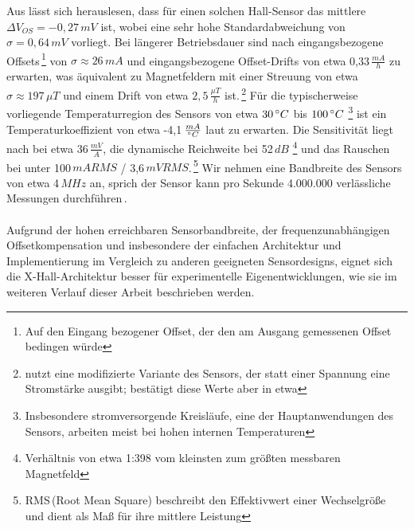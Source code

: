 \documentclass[12pt, a4paper]{article}
\begin{document}
Aus \cite{cres18} lässt sich herauslesen, dass für einen solchen Hall-Sensor das mittlere $\Delta{V_{OS}}=-0,27\,mV$ ist, wobei eine sehr hohe Standardabweichung von $\sigma=0,64\,mV$ vorliegt.\newline
Bei längerer Betriebsdauer sind nach \cite{cres23} eingangsbezogene Offsets\,\footnote{Auf den Eingang bezogener Offset, der den am Ausgang gemessenen Offset bedingen würde} von $\sigma\approx26\,mA$ und eingangsbezogene Offset-Drifts von etwa 0,33\,$\frac{mA}{h}$ zu erwarten, was äquivalent zu Magnetfeldern mit einer Streuung von etwa $\sigma\approx197\,\mu{T}$ und einem Drift von etwa $2,5\,\frac{\mu{T}}{h}$ ist.\,\footnote{\cite{cres23} nutzt eine modifizierte Variante des Sensors, der statt einer Spannung eine Stromstärke ausgibt; \cite{cres21} bestätigt diese Werte aber in etwa}\newline
Für die typischerweise vorliegende Temperaturregion des Sensors von etwa $30\,\degree{C}$ bis $100\,\degree{C}$ \footnote{Insbesondere stromversorgende Kreisläufe, eine der Hauptanwendungen des Sensors, arbeiten meist bei hohen internen Temperaturen} ist ein Temperaturkoeffizient von etwa -4,1\,$\frac{mA}{\degree{C}}$ laut \cite{cres23} zu erwarten.\newline
Die Sensitivität liegt nach \cite{cres21Hall} bei etwa 36\,$\frac{mV}{A}$, die dynamische Reichweite bei 52\,$dB$ \footnote{Verhältnis von etwa 1:398 vom kleinsten zum größten messbaren Magnetfeld} und das Rauschen bei unter 100\,$mA RMS$ / 3,6\,$mV RMS$.\,\footnote{RMS\,(Root Mean Square) beschreibt den Effektivwert einer Wechselgröße und dient als Maß für ihre mittlere Leistung}\newline
Wir nehmen eine Bandbreite des Sensors von etwa 4\,$MHz$ an, sprich der Sensor kann pro Sekunde 4.000.000 verlässliche Messungen durchführen\,\cite{cres21}. \paragraph{}

Aufgrund der hohen erreichbaren Sensorbandbreite, der frequenzunabhängigen Offsetkompensation und insbesondere der einfachen Architektur und Implementierung im Vergleich zu anderen geeigneten Sensordesigns, eignet sich die X-Hall-Architektur besser für experimentelle Eigenentwicklungen, wie sie im weiteren Verlauf dieser Arbeit beschrieben werden. %
\end{document}
